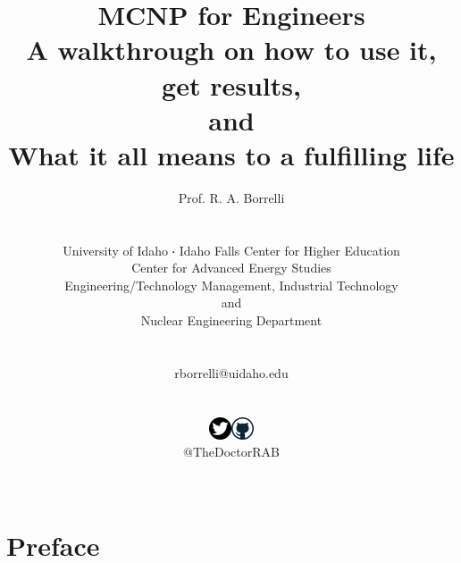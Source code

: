 \documentclass[11pt,a4paper]{article}
\newcommand*\sq{\mathbin{\vcenter{\hbox{\rule{.3ex}{.3ex}}}}} %
\begin{document}
\begin{titlepage}
    \title{
        \textbf{MCNP for Engineers}\\
        A walkthrough on how to use it, get results,\\
        and\\
        What it all means to a fulfilling life
    }
    \author{
        Prof. R. A. Borrelli
        \\ \\ \\
        University of Idaho $\sq$ Idaho Falls Center for Higher Education\\
        Center for Advanced Energy Studies\\[0.05in]
        Engineering/Technology Management, Industrial Technology\\and\\Nuclear Engineering Department
        \\ \\ \\
        rborrelli@uidaho.edu
        \\ \\ \\
        \includegraphics{twitter.png}\includegraphics{git.png}\\
        @TheDoctorRAB\\ \\
    }
\clearpage %
\maketitle
\thispagestyle{empty} %
\end{titlepage}


\section{Preface} \label{preface}
\end{document}

